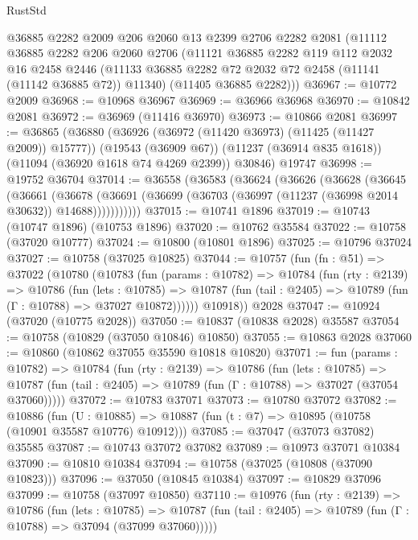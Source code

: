 \begin{lexlean}{RustStd}
\begin{coremodule}
    @36885
    @2282
    @2009
    @206
    @2060
    @13
    @2399
    @2706
    @2282
    @2081
    (@11112
      @36885
      @2282
      @206
      @2060
      @2706
      (@11121
        @36885
        @2282
        @119
        @112
        @2032
        @16
        @2458
        @2446
        (@11133 @36885 @2282 @72 @2032 @72 @2458 (@11141 (@11142 @36885 @72)) @11340)
        (@11405 @36885 @2282)))
@36967 := @10772 @2009
@36968 := @10968 @36967
@36969 := @36966 @36968
@36970 := @10842 @2081
@36972 := @36969 (@11416 @36970)
@36973 := @10866 @2081
@36997 := @36865
    (@36880
      (@36926 (@36972 (@11420 @36973) (@11425 (@11427 @2009)) @15777))
      (@19543 (@36909 @67))
      (@11237 (@36914 @835 @1618))
      (@11094 (@36920 @1618 @74 @4269 @2399))
      @30846)
    @19747
@36998 := @19752 @36704
@37014 := @36558
    (@36583
      (@36624
        (@36626
          (@36628
            (@36645
              (@36661
                (@36678
                  (@36691 (@36699 (@36703 (@36997 (@11237 (@36998 @2014 @30632)) @14688)))))))))))
@37015 := @10741 @1896
@37019 := @10743 (@10747 @1896) (@10753 @1896)
@37020 := @10762 @35584
@37022 := @10758 (@37020 @10777)
@37024 := @10800 (@10801 @1896)
@37025 := @10796 @37024
@37027 := @10758 (@37025 @10825)
@37044 := @10757
    (fun (fn : @51) =>
    @37022
      (@10780
        (@10783
          (fun (params : @10782) =>
          @10784
            (fun (rty : @2139) =>
            @10786
              (fun (lets : @10785) =>
              @10787 (fun (tail : @2405) => @10789 (fun (Γ : @10788) => @37027 @10872))))))
        @10918))
    @2028
@37047 := @10924 (@37020 (@10775 @2028))
@37050 := @10837 (@10838 @2028) @35587
@37054 := @10758 (@10829 (@37050 @10846) @10850)
@37055 := @10863 @2028
@37060 := @10860 (@10862 @37055 @35590 @10818 @10820)
@37071 := fun (params : @10782) =>
  @10784
    (fun (rty : @2139) =>
    @10786
      (fun (lets : @10785) =>
      @10787 (fun (tail : @2405) => @10789 (fun (Γ : @10788) => @37027 (@37054 @37060)))))
@37072 := @10783 @37071
@37073 := @10780 @37072
@37082 := @10886
    (fun (U : @10885) => @10887 (fun (t : @7) => @10895 (@10758 (@10901 @35587 @10776) @10912)))
@37085 := @37047 (@37073 @37082) @35585
@37087 := @10743 @37072 @37082
@37089 := @10973 @37071 @10384
@37090 := @10810 @10384
@37094 := @10758 (@37025 (@10808 (@37090 @10823)))
@37096 := @37050 (@10845 @10384)
@37097 := @10829 @37096
@37099 := @10758 (@37097 @10850)
@37110 := @10976
    (fun (rty : @2139) =>
    @10786
      (fun (lets : @10785) =>
      @10787 (fun (tail : @2405) => @10789 (fun (Γ : @10788) => @37094 (@37099 @37060)))))

\end{coremodule}
\end{lexlean}
